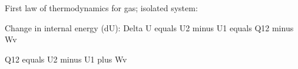 First law of thermodynamics for gas; isolated system:  

Change in internal energy (dU):  
Delta U equals U2 minus U1 equals Q12 minus Wv  

Q12 equals U2 minus U1 plus Wv